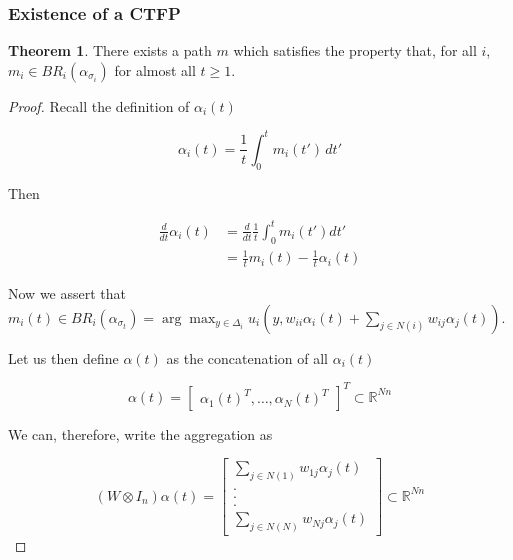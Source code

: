 \documentclass{article}
\theoremstyle{definition}
\newtheorem{theorem}{Theorem}
\begin{document}
	\subsubsection*{Existence of a CTFP}

	\begin{theorem}
		There exists a path $m$ which satisfies the property that, for all $i$, $m_i \in BR_i
		(\alpha_{\sigma_i})$ for almost all $t \geq 1$.
	\end{theorem}

	\begin{proof}
		Recall the definition of $\alpha_i(t)$

		\begin{equation*}
		\alpha_i(t) = \frac{1}{t} \int_{0}^{t} m_i(t') \, dt'
		\end{equation*}

		Then 

		\begin{align}
		\frac{d}{dt} \alpha_i(t) & = \frac{d}{dt} \frac{1}{t} \int_{0}^t m_i(t') dt' \nonumber \\
		& = \frac{1}{t} m_i(t) - \frac{1}{t} \alpha_i(t)
		\end{align}

		Now we assert that $m_i(t) \in BR_i(\alpha_{\sigma_t}) = \arg\max_{y \in \Delta_i} u_i(y,
		w_{ii} \alpha_i(t) + \sum_{j \in N(i)} w_{ij} \alpha_j(t))$. 

		Let us then define $\alpha(t)$ as the concatenation of all $\alpha_i(t)$

		\begin{equation}
			\alpha(t) = \begin{bmatrix}
				\alpha_1(t)^T, \ldots, \alpha_N(t)^T
			\end{bmatrix}^T \subset \mathbb{R}^{Nn}
		\end{equation}


		We can, therefore, write the aggregation as

		\begin{equation}
			(W \otimes I_n) \alpha(t) = \begin{bmatrix}
				\sum_{j \in N(1)} w_{1j} \alpha_j(t) \\
				.\\
				.\\
				.\\
				\sum_{j \in N(N)} w_{Nj} \alpha_j(t)
			\end{bmatrix} \subset \mathbb{R}^{Nn}
		\end{equation}


\end{proof}
\end{document}
